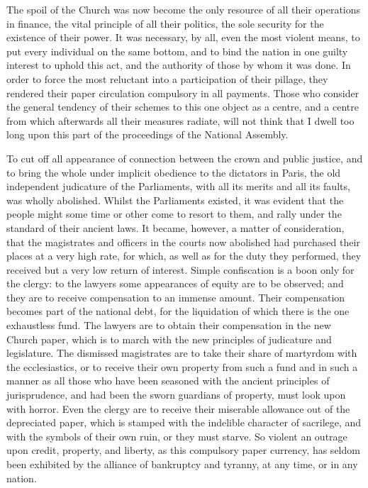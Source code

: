 The spoil of the Church was now become the only resource of all their operations in finance, the vital principle of all their politics, the sole security for the existence of their power. It was necessary, by all, even the most violent means, to put every individual on the same bottom, and to bind the nation in one guilty interest to uphold this act, and the authority of those by whom it was done. In order to force the most reluctant into a participation of their pillage, they rendered their paper circulation compulsory in all payments. Those who consider the general tendency of their schemes to this one object as a centre, and a centre from which afterwards all their measures radiate, will not think that I dwell too long upon this part of the proceedings of the National Assembly.

To cut off all appearance of connection between the crown and public justice, and to bring the whole under implicit obedience to the dictators in Paris, the old independent judicature of the Parliaments, with all its merits and all its faults, was wholly abolished. Whilst the Parliaments existed, it was evident that the people might some time or other come to resort to them, and rally under the standard of their ancient laws. It became, however, a matter of consideration, that the magistrates and officers in the courts now abolished had purchased their places at a very high rate, for which, as well as for the duty they performed, they received but a very low return of interest. Simple confiscation is a boon only for the clergy: to the lawyers some appearances of equity are to be observed; and they are to receive compensation to an immense amount. Their compensation becomes part of the national debt, for the liquidation of which there is the one exhaustless fund. The lawyers are to obtain their compensation in the new Church paper, which is to march with the new principles of judicature and legislature. The dismissed magistrates are to take their share of martyrdom with the ecclesiastics, or to receive their own property from such a fund and in such a manner as all those who have been seasoned with the ancient principles of jurisprudence, and had been the sworn guardians of property, must look upon with horror. Even the clergy are to receive their miserable allowance out of the depreciated paper, which is stamped with the indelible character of sacrilege, and with the symbols of their own ruin, or they must starve. So violent an outrage upon credit, property, and liberty, as this compulsory paper currency, has seldom been exhibited by the alliance of bankruptcy and tyranny, at any time, or in any nation.

